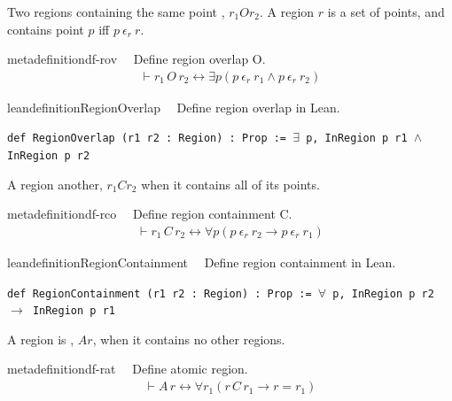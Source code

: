 \pn Two regions containing the same point , $r_1Or_2$.  A region $r$ is a set of points, and {contains} point $p$
iff $p~\epsilon_r~ r$.
\begin{restatable}{metadefinition}{df-rov}~~ Define region overlap O.
\begin{align}
\vdash r_1 \,O \,r_2 \leftrightarrow \exists p ( p ~\epsilon_r~ r_1 \wedge p
    ~\epsilon_r~ r_2 )\label{eq:df-rov}\tag{df-rov}
\end{align}
\end{restatable}

\begin{restatable}{leandefinition}{RegionOverlap}~~ Define region overlap in Lean.

\texttt{\textcolor{leancolor}{def} \textcolor{leanyellow}{RegionOverlap} (r1 r2 : Region) : Prop := $\exists$ p, InRegion p r1 $\wedge$ InRegion p r2}
\label{RegionOverlap}
\end{restatable}

\pn A region  another, $r_1Cr_2$ when it contains all of its points.
\begin{restatable}{metadefinition}{df-rco}~~ Define region containment C.
\begin{align}
\vdash r_1 \,C \,r_2 \leftrightarrow \forall p ( p ~\epsilon_r~ r_2 \rightarrow p
    ~\epsilon_r~ r_1 )\label{eq:df-rco}\tag{df-rco}
\end{align}
\end{restatable}

\begin{restatable}{leandefinition}{RegionContainment}~~ Define region containment in Lean.

\texttt{\textcolor{leancolor}{def} \textcolor{leanyellow}{RegionContainment} (r1 r2 : Region) : Prop := $\forall$ p, InRegion p r2 $\to$ InRegion p r1}
\label{RegionContainment}
\end{restatable}

\pn A region is , $Ar$, when it contains no other regions.
\begin{restatable}{metadefinition}{df-rat}~~ Define atomic region.
\begin{align}
\vdash A \,r \leftrightarrow \forall r_1 ( r \,C
    \,r_1 \rightarrow r = r_1 )\label{eq:df-rat}\tag{df-rat}
\end{align}
\end{restatable}

